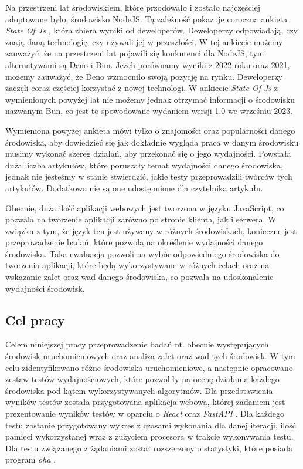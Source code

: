 Na przestrzeni lat środowiskiem, które przodowało i zostało najczęściej adoptowane było, środowisko NodeJS. Tą zależność pokazuje coroczna ankieta \textit{State Of Js} \cite{State_of_js:2021} \cite{State_of_js:2022}, która zbiera wyniki od deweloperów. Deweloperzy odpowiadają, czy znają daną technologię, czy używali jej w przeszłości. W tej ankiecie możemy zauważyć, że na przestrzeni lat pojawili się konkurenci dla NodeJS, tymi alternatywami są Deno i Bun. Jeżeli porównamy wyniki z 2022 roku oraz 2021, możemy zauważyć, że Deno wzmocniło swoją pozycję na rynku. Deweloperzy zaczęli coraz częściej korzystać z nowej technologi. W ankiecie \textit{State Of Js} \cite{State_of_js:2021} \cite{State_of_js:2022} z wymienionych powyżej lat nie możemy jednak otrzymać informacji o środowisku nazwanym Bun, co jest to spowodowane wydaniem wersji 1.0 we wrześniu 2023.

Wymieniona powyżej ankieta mówi tylko o znajomości oraz popularności danego środowiska, aby dowiedzieć się jak dokładnie wygląda praca w danym środowisku musimy wykonać szereg działań, aby przekonać się o jego wydajności. Powstała duża liczba artykułów, które poruszały temat wydajności danego środowiska, jednak nie jesteśmy w stanie stwierdzić, jakie testy przeprowadzili twórców tych artykułów. Dodatkowo nie są one udostępnione dla czytelnika artykułu.

Obecnie, duża ilość aplikacji webowych jest tworzona w języku JavaScript, co pozwala na tworzenie aplikacji zarówno po stronie klienta, jak i serwera. W związku z tym, że język ten jest używany w różnych środowiskach, konieczne jest przeprowadzenie badań, które pozwolą na określenie wydajności danego środowiska. Taka ewaluacja pozwoli na wybór odpowiedniego środowiska do tworzenia aplikacji, które będą wykorzystywane w różnych celach oraz na wskazanie zalet oraz wad danego środowiska, co pozwala na udoskonalenie wydajności środowisk.  

\subsection{Cel pracy}
Celem niniejszej pracy przeprowadzenie badań nt. obecnie występujących środowisk uruchomieniowych oraz analiza zalet oraz wad tych środowisk. W tym celu zidentyfikowano różne środowiska uruchomieniowe, a następnie opracowano zestaw testów wydajnościowych, które pozwoliły na ocenę działania każdego środowiska pod kątem wykorzystywanych algorytmów. Dla przedstawienia wyników testów  została przygotowana aplikacja webowa, której zadaniem jest prezentowanie wyników testów w oparciu o \textit{React} \cite{React} oraz \textit{FastAPI} \cite{FastAPI}. Dla każdego testu zostanie przygotowany wykres z czasami wykonania dla danej iteracji, ilość pamięci wykorzystanej wraz z zużyciem procesora w trakcie wykonywania testu. Dla testu związanego z żądaniami  został rozszerzony o statystyki, które posiada program \textit{oha} \cite{oha}.

